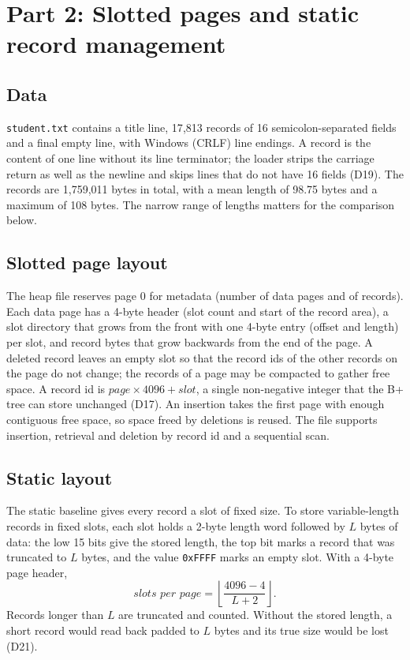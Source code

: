 \documentclass[11pt,a4paper]{article}
\begin{document}
\section{Part 2: Slotted pages and static record management}
\label{sec:part2}

\subsection{Data}

\texttt{student.txt} contains a title line, 17{,}813 records of 16 semicolon-separated fields and a final empty line, with Windows (CRLF) line endings. A record is the content of one line without its line terminator; the loader strips the carriage return as well as the newline and skips lines that do not have 16 fields (D19). The records are 1{,}759{,}011 bytes in total, with a mean length of 98.75 bytes and a maximum of 108 bytes. The narrow range of lengths matters for the comparison below.

\subsection{Slotted page layout}

The heap file reserves page 0 for metadata (number of data pages and of records). Each data page has a 4-byte header (slot count and start of the record area), a slot directory that grows from the front with one 4-byte entry (offset and length) per slot, and record bytes that grow backwards from the end of the page. A deleted record leaves an empty slot so that the record ids of the other records on the page do not change; the records of a page may be compacted to gather free space. A record id is \(\textit{page} \times 4096 + \textit{slot}\), a single non-negative integer that the B+ tree can store unchanged (D17). An insertion takes the first page with enough contiguous free space, so space freed by deletions is reused. The file supports insertion, retrieval and deletion by record id and a sequential scan.

\subsection{Static layout}

The static baseline gives every record a slot of fixed size. To store variable-length records in fixed slots, each slot holds a 2-byte length word followed by \(L\) bytes of data: the low 15 bits give the stored length, the top bit marks a record that was truncated to \(L\) bytes, and the value \texttt{0xFFFF} marks an empty slot. With a 4-byte page header,
\[
\textit{slots per page} = \left\lfloor \frac{4096 - 4}{L + 2} \right\rfloor .
\]
Records longer than \(L\) are truncated and counted. Without the stored length, a short record would read back padded to \(L\) bytes and its true size would be lost (D21).
\end{document}
